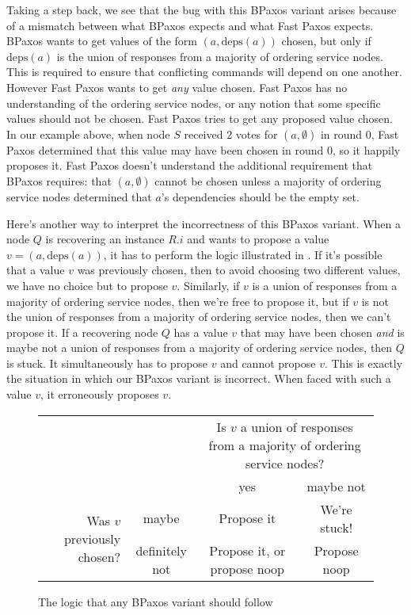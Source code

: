 \documentclass{mwhittaker}
\theoremstyle{definition}
\newcommand{\deps}[1]{\text{deps}(#1)}
\begin{document}
Taking a step back, we see that the bug with this BPaxos variant arises because
of a mismatch between what BPaxos expects and what Fast Paxos expects. BPaxos
wants to get values of the form $(a, \deps{a})$ chosen, but only if $\deps{a}$
is the union of responses from a majority of ordering service nodes. This is
required to ensure that conflicting commands will depend on one another.
However Fast Paxos wants to get \emph{any} value chosen. Fast Paxos has no
understanding of the ordering service nodes, or any notion that some specific
values should not be chosen. Fast Paxos tries to get any proposed value chosen.
In our example above, when node $S$ received 2 votes for $(a, \emptyset)$ in
round 0, Fast Paxos determined that this value may have been chosen in round 0,
so it happily proposes it. Fast Paxos doesn't understand the additional
requirement that BPaxos requires: that $(a, \emptyset)$ cannot be chosen unless
a majority of ordering service nodes determined that $a$'s dependencies should
be the empty set.

Here's another way to interpret the incorrectness of this BPaxos variant. When
a node $Q$ is recovering an instance $R.i$ and wants to propose a value $v =
(a, \deps{a})$, it has to perform the logic illustrated in
.
%
If it's possible that a value $v$ was previously chosen, then to avoid choosing
two different values, we have no choice but to propose $v$.
%
Similarly, if $v$ is a union of responses from a majority of ordering service
nodes, then we're free to propose it, but if $v$ is not the union of responses
from a majority of ordering service nodes, then we can't propose it.
%
If a recovering node $Q$ has a value $v$ that may have been chosen \emph{and}
is maybe not a union of responses from a majority of ordering service nodes,
then $Q$ is stuck. It simultaneously has to propose $v$ and cannot propose $v$.
This is exactly the situation in which our BPaxos variant is incorrect. When
faced with such a value $v$, it erroneously proposes $v$.

\begin{figure}[h]
  \centering
  \begin{tabular}{rccc}
    &
    &
    \multicolumn{2}{p{3in}}{%
      Is $v$ a union of responses from a majority of ordering service nodes?%
    } \\
    &
    &
    yes &
    maybe not \\\cline{3-4}
    \multirow{2}{1.8in}{Was $v$ previously chosen?} &
    maybe &
    \multicolumn{1}{|c|}{Propose it} &
    \multicolumn{1}{|c|}{We're stuck!} \\\cline{3-4}
    &
    definitely not &
    \multicolumn{1}{|c|}{Propose it, or propose noop} &
    \multicolumn{1}{|c|}{Propose noop} \\\cline{3-4}
  \end{tabular}
  \caption{The logic that any BPaxos variant should follow}%
\end{figure}
\end{document}
